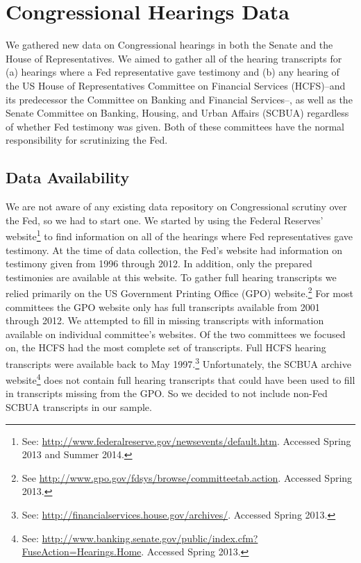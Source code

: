 \documentclass[a4paper]{article}\usepackage[]{graphicx}\usepackage[]{color}
\begin{document}
\section{Congressional Hearings Data}

We gathered new data on Congressional hearings in both the Senate and the House of Representatives. We aimed to gather all of the hearing transcripts for (a) hearings where a Fed representative gave testimony and (b) any hearing of the US House of Representatives Committee on Financial Services (HCFS)--and its predecessor the Committee on Banking and Financial Services--, as well as the Senate Committee on Banking, Housing, and Urban Affairs (SCBUA) regardless of whether Fed testimony was given. Both of these committees have the normal responsibility for scrutinizing the Fed.

\subsection{Data Availability}

We are not aware of any existing data repository on Congressional scrutiny over the Fed, so we had to start one. We started by using the Federal Reserves' website\footnote{See: \url{http://www.federalreserve.gov/newsevents/default.htm}. Accessed Spring 2013 and Summer 2014.} to find information on all of the hearings where Fed representatives gave testimony. At the time of data collection, the Fed's website had information on testimony given from 1996 through 2012. In addition, only the prepared testimonies are available at this website. To gather full hearing transcripts we relied primarily on the US Government Printing Office (GPO) website.\footnote{See \url{http://www.gpo.gov/fdsys/browse/committeetab.action}. Accessed Spring 2013.} For most committees the GPO website only has full transcripts available from 2001 through 2012. We attempted to fill in missing transcripts with information available on individual committee's websites. Of the two committees we focused on, the HCFS had the most complete set of transcripts. Full HCFS hearing transcripts were available back to May 1997.\footnote{See: \url{http://financialservices.house.gov/archives/}. Accessed Spring 2013.} Unfortunately, the SCBUA archive website\footnote{See: \url{http://www.banking.senate.gov/public/index.cfm?FuseAction=Hearings.Home}. Accessed Spring 2013.} does not contain full hearing transcripts that could have been used to fill in transcripts missing from the GPO. So we decided to not include non-Fed SCBUA transcripts in our sample.
\end{document}
